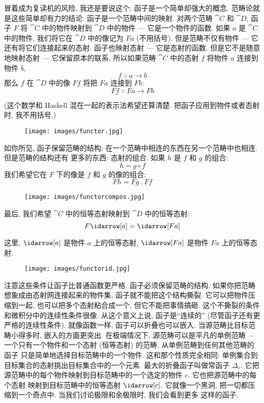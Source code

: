 
\lettrine[lhang=0.17]{冒}{着}成为复读机的风险, 我还是要说这个: 函子是一个简单却强大的概念.
范畴论就是这些简单却有力的结论. 函子是一个范畴中间的映射. 对两个范畴 $\cat{C}$ 和 $\cat{D}$,
函子 $F$ 将 $\cat{C}$ 中的物件映射到 $\cat{D}$ 中的物件 --- 它是一个物件的函数. 如果 $a$
是 $\cat{C}$ 中的物件, 我们将它在 $\cat{D}$ 中的像记为 $F a$ (不用括号). 但是范畴不仅有物件
--- 它还有将它们连接起来的态射. 函子也映射态射 --- 它是态射的函数. 但是它不是随意地映射态射
--- 它保留原本的联系. 所以如果范畴 $\cat{C}$ 中的态射 $f$ 将物件 $a$ 连接到物件 $b$,
\[f \Colon a \to b\]
那么 $f$ 在 $\cat{D}$ 中的像 $F f$ 将把 $F a$ 连接到 $F b$:
\[F f \Colon F a \to F b\]

(这个数学和 Haskell 混在一起的表示法希望还算清楚. 把函子应用到物件或者态射时, 我不用括号.)

\begin{figure}[H]
  \centering\texttt{[image: images/functor.jpg]}
\end{figure}

\noindent
如你所见, 函子保留范畴的结构: 在一个范畴中相连的东西在另一个范畴中也相连. 但是范畴的结构还有
更多的东西: 态射的组合. 如果 $h$ 是 $f$ 和 $g$ 的组合:
\[h = g \circ f\]
我们希望它在 $F$ 下的像是 $f$ 和 $g$ 的像的组合:
\[F h = F g~.~F f\]

\begin{figure}[H]
  \centering
  \texttt{[image: images/functorcompos.jpg]}
\end{figure}

\noindent
最后, 我们希望 $\cat{C}$ 中的恒等态射映射到 $\cat{D}$ 中的恒等态射:
\[F \idarrow[a] = \idarrow[F a]\]

\noindent
这里, $\idarrow[a]$ 是物件 $a$ 上的恒等态射, $\idarrow[F a]$ 是物件 $F a$ 上的恒等态射.

\begin{figure}[H]
  \centering
  \texttt{[image: images/functorid.jpg]}
\end{figure}

\noindent

注意这些条件让函子比普通函数更严格. 函子必须保留范畴的结构. 如果你把范畴想象成由态射网连接起来的物件集,
函子就不能把这个结构撕裂. 它可以把物件压缩到一起, 也可以把多个态射粘合成一个, 但它不能把事情搞砸.
这个不撕裂的条件和微积分中的连续性条件很像. 从这个意义上说, 函子是``连续的'' (尽管函子还有更严格的连续性条件).
就像函数一样, 函子可以折叠也可以嵌入. 当源范畴比目标范畴小得多时, 嵌入的方面更突出. 在极端情况下,
源范畴可以是平凡的单例范畴 --- 一个只有一个物件和一个态射 (恒等态射) 的范畴. 从单例范畴到任何其他范畴的函子
只是简单地选择目标范畴中的一个物件. 这和那个性质完全相同: 单例集合到目标集合的态射挑出目标集合中的一个元素.
最大的折叠函子叫做常函子 $\Delta_c$. 它把源范畴中的每个物件映射到目标范畴中的一个选定的物件 $c$. 它也把源范畴中的每个态射
映射到目标范畴中的恒等态射 $\idarrow[c]$. 它就像一个黑洞, 把一切都压缩到一个奇点中. 当我们讨论极限和余极限时, 我们会看到更多
这样的函子.

